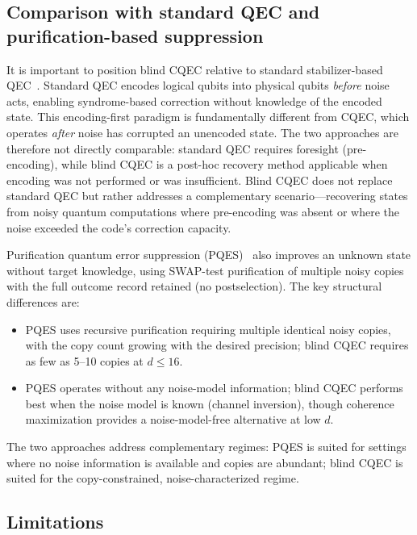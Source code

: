 \documentclass[a4paper,onecolumn]{quantumarticle}
\begin{document}
\subsection{Comparison with standard QEC and purification-based suppression}
\label{sec:pqec}

It is important to position blind CQEC relative to standard stabilizer-based QEC~\cite{Shor1995,Gottesman1997}.
Standard QEC encodes logical qubits into physical qubits \emph{before} noise acts, enabling syndrome-based correction without knowledge of the encoded state.
This encoding-first paradigm is fundamentally different from CQEC, which operates \emph{after} noise has corrupted an unencoded state.
The two approaches are therefore not directly comparable: standard QEC requires foresight (pre-encoding), while blind CQEC is a post-hoc recovery method applicable when encoding was not performed or was insufficient.
Blind CQEC does not replace standard QEC but rather addresses a complementary scenario---recovering states from noisy quantum computations where pre-encoding was absent or where the noise exceeded the code's correction capacity.

Purification quantum error suppression (PQES)~\cite{Raghoonanan2026} also improves an unknown state without target knowledge, using SWAP-test purification of multiple noisy copies with the full outcome record retained (no postselection).
The key structural differences are:
\begin{itemize}
\item PQES uses recursive purification requiring multiple identical noisy copies, with the copy count growing with the desired precision;
blind CQEC requires as few as 5--10 copies at $d \leq 16$.
\item PQES operates without any noise-model information;
blind CQEC performs best when the noise model is known (channel inversion), though coherence maximization provides a noise-model-free alternative at low $d$.
\end{itemize}
The two approaches address complementary regimes: PQES is suited for settings where no noise information is available and copies are abundant; blind CQEC is suited for the copy-constrained, noise-characterized regime.


\subsection{Limitations}
\label{sec:limitations}
\end{document}
